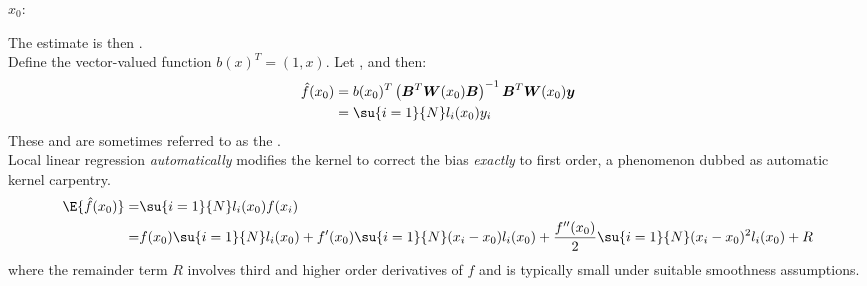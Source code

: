  $x_{0}$:
\begin{center}
\end{center}
The estimate is then .\\
Define the vector-valued function $b(x)^{T} = (1,x)$. Let , and  then:
\begin{align*}
	\hat{f}(x_{0}) &= b(x_{0})^{T}\left(\bm{B}^{T}\bm{W}(x_{0})\bm{B}\right)^{-1}\bm{B}^{T}\bm{
	W}(x_{0})\bm{y}\\
	&= \su{{i=1}}{N}l_{i}(x_{0})y_{i}
\end{align*}
These  and are sometimes referred to as the .\\
Local linear regression \textit{automatically} modifies the kernel to correct the bias 
\textit{exactly} to first order, a phenomenon dubbed as automatic kernel carpentry. 
\begin{align*}
	\E{\hat{f}(x_{0})} =& \su{{i=1}}{N}l_{i}(x_{0})f(x_{i})\\
	=& f(x_{0})\su{{i=1}}{N}l_{i}(x_{0}) + f'(x_{0})\su{{i=1}}{N}(x_{i}-x_{0})l_{i}(x_{0})
	+ \dfrac{f''(x_{0})}{2}\su{{i=1}}{N}(x_{i}-x_{0})^{2}l_{i}(x_{0}) + R
\end{align*}
where the remainder term $R$ involves third and higher order derivatives of $f$ and is typically
small under suitable smoothness assumptions.

